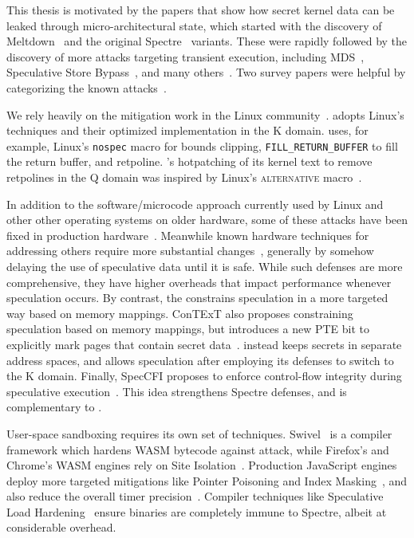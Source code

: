 \label{s:related}

This thesis is motivated by the papers that show how secret kernel data
can be leaked through micro-architectural state, which started with the discovery of Meltdown~\cite{lipp:meltdown} and the original Spectre~\cite{kocher:spectre} variants.
These were rapidly followed by the discovery of more attacks targeting transient execution, including MDS~\cite{canella:fallout,schwarz:zombieload,schaik:ridl}, Speculative Store Bypass~\cite{horn:speculative-store-bypass}, and many others~\cite{bhattacharyya:smotherspectre,bulck:foreshadow,chen:sgxspectre,koruyeh:spectrersb,ragab:crosstalk,stecklina:lazyfp,schaik:cacheout,weisse:foreshadow-ng, bulck:lvi}.
Two survey papers were helpful by categorizing the known attacks~\cite{hill:survey,sok:transient,xiong:survey}.

We rely heavily on the mitigation work in the Linux
community~\cite{linux:vuln}. \sys adopts Linux's techniques and their
optimized implementation in the K domain.  \sys uses, for example,
Linux's \texttt{nospec} macro for bounds clipping,
\texttt{FILL\_RETURN\_BUFFER} to fill the return buffer, and retpoline.
\sys's hotpatching of its kernel text to remove retpolines in the Q
domain was inspired by Linux's \textsc{alternative}
macro~\cite{lwn:alternative}.

In addition to the software/microcode approach currently used by Linux and other other operating systems on older hardware, some of these attacks have been fixed in production hardware~\cite{intel:affected-processors}.
Meanwhile known hardware techniques for addressing others require more substantial changes~\cite{barber:specshield, weisse:nda, ainsworth:muontrap,yu:stt,yu:sdo}, generally by somehow delaying the use of speculative data until it is safe.
While such defenses are
more comprehensive, they have higher overheads that impact performance whenever
speculation occurs. By contrast, the \contract constrains speculation in a more
targeted way based on memory mappings. ConTExT also proposes constraining
speculation based on memory mappings, but introduces a new PTE bit to explicitly
mark pages that contain secret data~\cite{ConTExT}. \sys instead keeps secrets in
separate address spaces, and allows speculation after employing its defenses to
switch to the K domain.  Finally, SpecCFI proposes to enforce control-flow
integrity during speculative execution~\cite{koruyeh:speccfi}. This idea strengthens
Spectre defenses, and is complementary to \sys.

User-space sandboxing requires its own set of techniques.
Swivel~\cite{narayan:swivel} is a compiler framework which hardens WASM bytecode against attack, while
Firefox's and Chrome's WASM engines rely on Site Isolation~\cite{reis:site-isolation}.
Production JavaScript engines deploy more targeted mitigations like Pointer Poisoning and Index Masking~\cite{webkit:spectre-meltdown}, and also reduce the overall timer precision~\cite{mozilla:timer-precision, webkit:spectre-meltdown}.
Compiler techniques like Speculative Load Hardening~\cite{carruth:slh} ensure binaries are completely immune to Spectre, albeit at considerable overhead.


